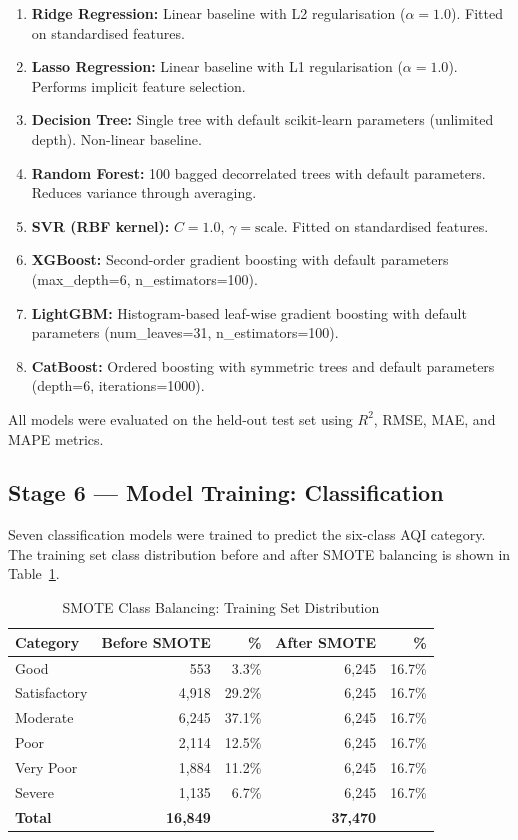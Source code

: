 \documentclass[12pt,a4paper]{report}
\begin{document}
\begin{enumerate}
    \item \textbf{Ridge Regression:} Linear baseline with L2 regularisation ($\alpha = 1.0$). Fitted on standardised features.
    \item \textbf{Lasso Regression:} Linear baseline with L1 regularisation ($\alpha = 1.0$). Performs implicit feature selection.
    \item \textbf{Decision Tree:} Single tree with default scikit-learn parameters (unlimited depth). Non-linear baseline.
    \item \textbf{Random Forest:} 100 bagged decorrelated trees with default parameters. Reduces variance through averaging.
    \item \textbf{SVR (RBF kernel):} $C = 1.0$, $\gamma = \text{scale}$. Fitted on standardised features.
    \item \textbf{XGBoost:} Second-order gradient boosting with default parameters (max\_depth=6, n\_estimators=100).
    \item \textbf{LightGBM:} Histogram-based leaf-wise gradient boosting with default parameters (num\_leaves=31, n\_estimators=100).
    \item \textbf{CatBoost:} Ordered boosting with symmetric trees and default parameters (depth=6, iterations=1000).
\end{enumerate}

All models were evaluated on the held-out test set using $R^2$, RMSE, MAE, and MAPE metrics.

\subsection{Stage 6 --- Model Training: Classification}

Seven classification models were trained to predict the six-class AQI category. The training set class distribution before and after SMOTE balancing is shown in Table~\ref{tab:smote}.

\begin{table}[H]
\centering
\caption{SMOTE Class Balancing: Training Set Distribution}
\label{tab:smote}
\begin{tabular}{|l|r|r|r|r|}
\hline
\textbf{Category} & \textbf{Before SMOTE} & \textbf{\%} & \textbf{After SMOTE} & \textbf{\%} \\
\hline
Good & 553 & 3.3\% & 6,245 & 16.7\% \\
\hline
Satisfactory & 4,918 & 29.2\% & 6,245 & 16.7\% \\
\hline
Moderate & 6,245 & 37.1\% & 6,245 & 16.7\% \\
\hline
Poor & 2,114 & 12.5\% & 6,245 & 16.7\% \\
\hline
Very Poor & 1,884 & 11.2\% & 6,245 & 16.7\% \\
\hline
Severe & 1,135 & 6.7\% & 6,245 & 16.7\% \\
\hline
\textbf{Total} & \textbf{16,849} & & \textbf{37,470} & \\
\hline
\end{tabular}
\end{table}
\end{document}
